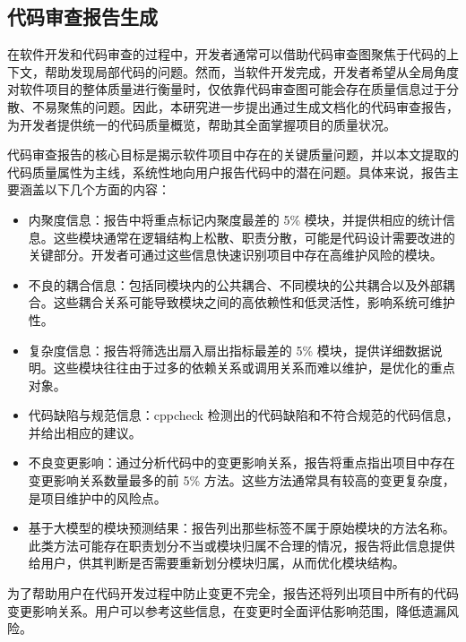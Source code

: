 \subsection{代码审查报告生成}

在软件开发和代码审查的过程中，开发者通常可以借助代码审查图聚焦于代码的上下文，帮助发现局部代码的问题。然而，当软件开发完成，开发者希望从全局角度对软件项目的整体质量进行衡量时，仅依靠代码审查图可能会存在质量信息过于分散、不易聚焦的问题。因此，本研究进一步提出通过生成文档化的代码审查报告，为开发者提供统一的代码质量概览，帮助其全面掌握项目的质量状况。

代码审查报告的核心目标是揭示软件项目中存在的关键质量问题，并以本文提取的代码质量属性为主线，系统性地向用户报告代码中的潜在问题。具体来说，报告主要涵盖以下几个方面的内容：

\begin{itemize}
    \item 内聚度信息：报告中将重点标记内聚度最差的 5\% 模块，并提供相应的统计信息。这些模块通常在逻辑结构上松散、职责分散，可能是代码设计需要改进的关键部分。开发者可通过这些信息快速识别项目中存在高维护风险的模块。
    
    \item 不良的耦合信息：包括同模块内的公共耦合、不同模块的公共耦合以及外部耦合。这些耦合关系可能导致模块之间的高依赖性和低灵活性，影响系统可维护性。
    
    \item 复杂度信息：报告将筛选出扇入扇出指标最差的 5\% 模块，提供详细数据说明。这些模块往往由于过多的依赖关系或调用关系而难以维护，是优化的重点对象。
    
    \item 代码缺陷与规范信息：cppcheck 检测出的代码缺陷和不符合规范的代码信息，并给出相应的建议。
    
    \item 不良变更影响：通过分析代码中的变更影响关系，报告将重点指出项目中存在变更影响关系数量最多的前 5\% 方法。这些方法通常具有较高的变更复杂度，是项目维护中的风险点。
    
    \item 基于大模型的模块预测结果：报告列出那些标签不属于原始模块的方法名称。此类方法可能存在职责划分不当或模块归属不合理的情况，报告将此信息提供给用户，供其判断是否需要重新划分模块归属，从而优化模块结构。
\end{itemize}

为了帮助用户在代码开发过程中防止变更不完全，报告还将列出项目中所有的代码变更影响关系。用户可以参考这些信息，在变更时全面评估影响范围，降低遗漏风险。


